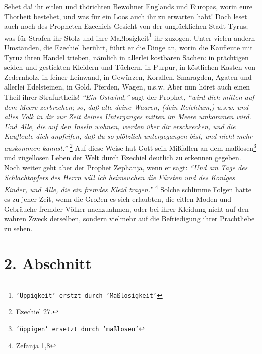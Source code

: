 Sehet da! ihr eitlen und thörichten Bewohner Englands und Europas, worin eure
Thorheit bestehet, und was für ein Loos auch ihr zu erwarten habt! Doch leset
auch noch des Propheten Ezechiels Gesicht von der unglücklichen Stadt Tyrus; was
für Strafen ihr Stolz und ihre Maßlosigkeit\footnote{\texttt{'Üppigkeit' erstzt durch 'Maßlosigkeit'}} ihr zuzogen. Unter vielen andern
Umständen, die Ezechiel berührt, führt er die Dinge an, worin die Kaufleute mit
Tyruz ihren Handel trieben, nämlich in allerlei kostbaren Sachen: in prächtigen
seiden und gestickten Kleidern und Tüchern, in Purpur, in köstlichen Kasten von
Zedernholz, in feiner Leinwand, in Gewürzen, Korallen, Smaragden, Agaten und
allerlei Edelsteinen, in Gold, Pferden, Wagen, u.s.w. Aber nun höret auch einen
Theil ihrer Strafurtheils! \textit{"`Ein Ostwind,"'} sagt der Prophet,
\textit{"`wird dich mitten
auf dem Meere zerbrechen; so, daß alle deine Waaren, (dein Reichtum,) u.s.w.
und alles Volk in dir zur Zeit deines Unterganges mitten im Meere umkommen wird.
Und Alle, die auf den Inseln wohnen, werden über dir erschrecken, und die
Kaufleute dich anpfeifen, daß du so plötzlich untergegangen bist, und nicht mehr
auskommen kannst."'}
\footnote{Ezechiel 27.}
Auf diese Weise hat Gott sein Mißfallen
an dem maßlosen\footnote{\texttt{'üppigen' ersetzt durch 'maßlosen'}} und zügellosen Leben der Welt durch Ezechiel deutlich zu erkennen
gegeben. Noch weiter geht aber der Prophet Zephanja, wenn er sagt:
\textit{"`Und am Tage
des Schlachtopfers des Herrn will ich heimsuchen die Fürsten und des Koniges
Kinder, und Alle, die ein fremdes Kleid tragen."'}
\footnote{Zefanja 1,8}
Solche
schlimme Folgen hatte es zu jener Zeit, wenn die Großen es sich erlaubten, die
eitlen Moden und Gebräuche fremder Völker nachzuahmen, oder bei ihrer Kleidung
nicht auf den wahren Zweck derselben, sondern vielmehr auf die Befriedigung
ihrer Prachtliebe zu sehen.

\section{2. Abschnitt} \label{kap15_ab2}

